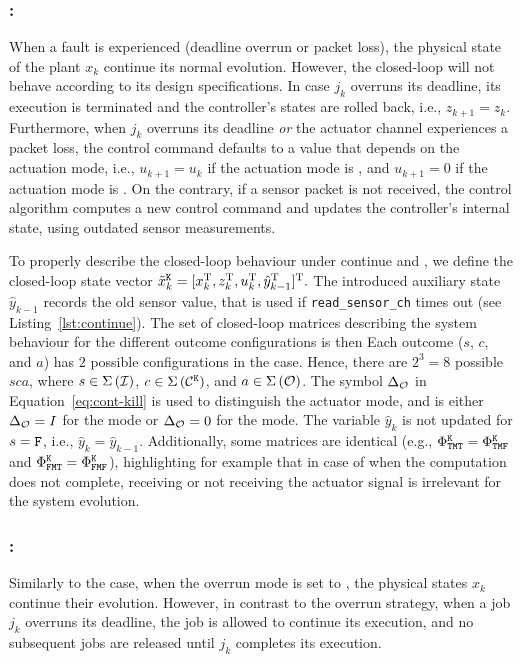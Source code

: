 \subsubsection*{\tK{}:}
%
When a fault is experienced (deadline overrun or packet loss), the physical state of the plant $x_k$ continue its normal evolution.
However, the closed-loop will not behave according to its design specifications.
In case $j_k$ overruns its deadline, its execution is terminated and the controller's states are rolled back, i.e., $z_{k+1} = z_k$.
Furthermore, when $j_k$ overruns its deadline \emph{or} the actuator channel experiences a packet loss, the control command defaults to a value that depends on the actuation mode, i.e., $u_{k+1} = u_k$ if the actuation mode is \tH{}, and $u_{k+1} = 0$ if the actuation mode is \tZ{}.
On the contrary, if a sensor packet is not received, the control algorithm computes a new control command and updates the controller's internal state, using outdated sensor measurements.

To properly describe the closed-loop behaviour under continue and \tK{}, we define the closed-loop state vector 
%
$\tilde x_k^{\texttt{K}} = [ x_k^{\mathrm{\small{T}}}{}, z_k^{\mathrm{\small{T}}}{}, u_k^{\mathrm{\small{T}}}{}, \hat y_{k-1}^{\mathrm{\small{T}}}{} ]^{\mathrm{\small{T}}}{}.$
%
The introduced auxiliary state $\hat y_{k-1}$ records the old sensor value, that is used if \texttt{read\_sensor\_ch} times out (see Listing~\ref{lst:continue}).
The set of closed-loop matrices describing the system behaviour for the different outcome configurations is then
{\small
%
}
Each outcome ($s$, $c$, and $a$) has $2$ possible configurations in the \tK{} case.
Hence, there are $2^3 = 8$ possible $sca$, where $s \in \Sigma\left( \mathcal{I} \right)$, $c \in \Sigma\,({\mathcal{C}^{\texttt{K}}})$, and $a \in \Sigma\left( \mathcal{O} \right)$.
The symbol $\Delta_{\mathcal{O}}$ in Equation~\eqref{eq:cont-kill} is used to distinguish the actuator mode, and is either $\Delta_{\mathcal{O}} = I$ for the \tH{} mode or $\Delta_{\mathcal{O}} = 0$ for the \tZ{} mode.
The variable $\hat y_k$ is not updated for $s = \texttt{F}$, i.e., $\hat y_k = \hat y_{k-1}$.
Additionally, some matrices are identical (e.g., $\Phi^{\texttt{K}}_{\texttt{T}\texttt{M}\texttt{T}}=\Phi^{\texttt{K}}_{\texttt{T}\texttt{M}\texttt{F}}$ and $\Phi^{\texttt{K}}_{\texttt{F}\texttt{M}\texttt{T}}=\Phi^{\texttt{K}}_{\texttt{F}\texttt{M}\texttt{F}}$), highlighting for example that in case of \tK{} when the computation does not complete, receiving or not receiving the actuator signal is irrelevant for the system evolution.

\subsubsection*{\tS{}:}
Similarly to the \tK{} case, when the overrun mode is set to \tS{}, the physical states $x_k$ continue their evolution.
However, in contrast to the \tK{} overrun strategy, when a job $j_k$ overruns its deadline, the job is allowed to continue its execution, and no subsequent jobs are released until $j_k$ completes its execution.

